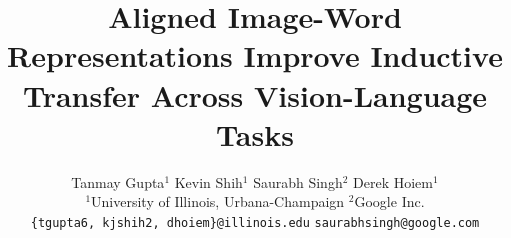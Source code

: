 \documentclass[10pt,twocolumn,letterpaper]{article}
\begin{document}
\title{Aligned Image-Word Representations Improve Inductive Transfer Across Vision-Language Tasks}
\author{Tanmay Gupta$^1$ \hspace{0,5cm} Kevin Shih$^1$ \hspace{0,5cm} Saurabh Singh$^2$ \hspace{0,5cm} Derek Hoiem$^1$\\
$^1$University of Illinois, Urbana-Champaign  \hspace{0,5cm} $^2$Google Inc.\\
{\tt\small \{tgupta6, kjshih2, dhoiem\}@illinois.edu} \hspace{0,5cm} {\tt\small saurabhsingh@google.com}}

\maketitle
\end{document}

